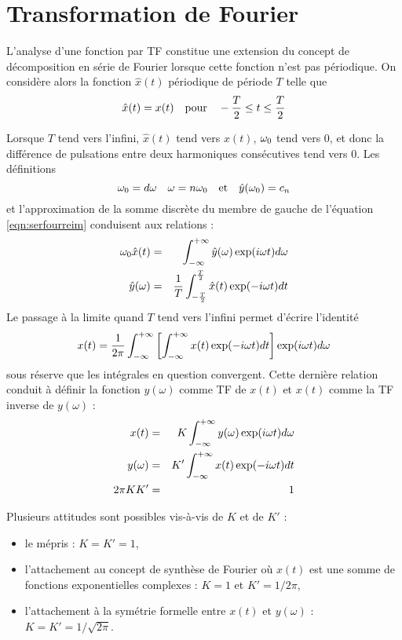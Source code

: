 \section{Transformation de Fourier}
L'analyse d'une fonction par TF constitue une extension du concept de
décomposition en série de Fourier lorsque cette fonction n'est pas périodique.
On considère alors la fonction $\hat{x}(t)$ périodique de période $T$ telle que
\begin{equation}
\hat{x}(t) = x(t) \quad \mbox{pour} \quad -\frac{T}{2} \le t \le \frac{T}{2}
\end{equation}

Lorsque $T$ tend vers l'infini, $\hat{x}(t)$ tend vers $x(t)$, $\omega_0$ tend vers 0,
et donc la différence de pulsations entre deux harmoniques consécutives
tend vers 0. Les définitions 
\begin{equation}
\omega_0 = d\omega \quad \omega = n\omega_0 \quad \mbox{et} \quad \hat{y}(\omega_0) = c_n
\end{equation}
et l'approximation de la somme discrète du membre de gauche de l'équation
\ref{eqn:serfourreim} conduisent aux relations :
\begin{eqnarray}
\omega_0 \hat{x}(t) & = & \int_{-\infty}^{+\infty} \hat{y}(\omega)\exp(i\omega t) d\omega \\
\hat{y}(\omega) & = & \frac{1}{T} \int_{-\frac{T}{2}}^{\frac{T}{2}} \hat{x}(t) \exp(-i\omega t) dt
\end{eqnarray}
Le passage à la limite quand $T$ tend vers l'infini permet d'écrire l'identité
\begin{equation}
x(t) = \frac{1}{2\pi}\int_{-\infty}^{+\infty}
\left[\int_{-\infty}^{+\infty} x(t) \exp(-i\omega t) dt
\right] \exp(i\omega t) d\omega
\end{equation}
sous réserve que les intégrales en question convergent.
Cette dernière relation conduit à définir la fonction $y(\omega)$
comme TF de $x(t)$ et $x(t)$ comme la TF inverse de $y(\omega)$ :
\begin{eqnarray}
\label{eqn:tfinv}
x(t) & = & K \int_{-\infty}^{+\infty} y(\omega) \exp(i\omega t) d\omega \\
\label{eqn:tf}
y(\omega) & = & K' \int_{-\infty}^{+\infty} x(t) \exp(-i\omega t) dt \\
2\pi K K' & = & 1
\end{eqnarray}

Plusieurs attitudes sont possibles vis-à-vis de $K$ et de $K'$ :
\begin{itemize}
\item le mépris : $K = K' = 1$,
\item l'attachement au concept de synthèse de Fourier où $x(t)$ est une somme de
fonctions exponentielles complexes : $K=1$ et $K' = 1/2\pi$,
\item l'attachement à la symétrie formelle entre $x(t)$ et $y(\omega)$ :
$K = K' = 1/\sqrt{2\pi}$.
\end{itemize}

